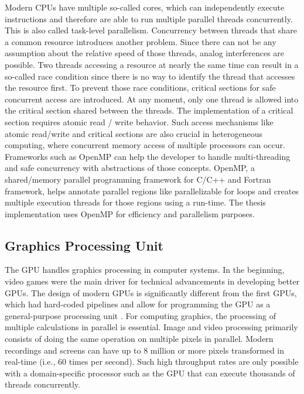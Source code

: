 Modern CPUs have multiple so-called cores, which can independently execute instructions and therefore are able to run multiple parallel threads concurrently. This is also called task-level parallelism.
Concurrency between threads that share a common resource introduces another problem. Since there can not be any assumption about the relative speed of those threads, analog interferences are possible. Two threads accessing a resource at nearly the same time can result in a so-called race condition since there is no way to identify the thread that accesses the resource first. To prevent those race conditions, critical sections for safe concurrent access are introduced. At any moment, only one thread is allowed into the critical section shared between the threads. The implementation of a critical section requires atomic read / write behavior.
Such access mechanisms like atomic read/write and critical sections are also crucial in heterogeneous computing, where concurrent memory access of multiple processors can occur.
Frameworks such as OpenMP can help the developer to handle multi-threading and safe concurrency with abstractions of those concepts. OpenMP, a shared/memory parallel programming framework for C/C++ and Fortran framework, helps annotate parallel regions like parallelizable for loops and creates multiple execution threads for those regions using a run-time.
The thesis implementation uses OpenMP for efficiency and parallelism purposes.

\subsection{Graphics Processing Unit}
The GPU handles graphics processing in computer systems. In the beginning, video games were the main driver for technical advancements in developing better GPUs. The design of modern GPUs is significantly different from the first GPUs, which had hard-coded pipelines and allow for programming the GPU as a general-purpose processing unit \cite{nickollsGPUComputingEra2010}. For computing graphics, the processing of multiple calculations in parallel is essential. Image and video processing primarily consists of doing the same operation on multiple pixels in parallel. Modern recordings and screens can have up to 8 million or more pixels transformed in real-time (i.e., 60 times per second). Such high throughput rates are only possible with a domain-specific processor such as the GPU that can execute thousands of threads concurrently.


